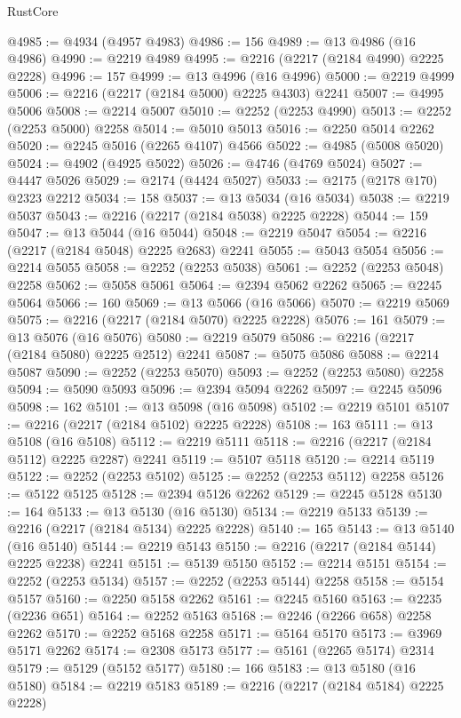\begin{lexlean}{RustCore}
\begin{coremodule}
@4985 := @4934 (@4957 @4983)
@4986 := 156
@4989 := @13 @4986 (@16 @4986)
@4990 := @2219 @4989
@4995 := @2216 (@2217 (@2184 @4990) @2225 @2228)
@4996 := 157
@4999 := @13 @4996 (@16 @4996)
@5000 := @2219 @4999
@5006 := @2216 (@2217 (@2184 @5000) @2225 @4303) @2241
@5007 := @4995 @5006
@5008 := @2214 @5007
@5010 := @2252 (@2253 @4990)
@5013 := @2252 (@2253 @5000) @2258
@5014 := @5010 @5013
@5016 := @2250 @5014 @2262
@5020 := @2245 @5016 (@2265 @4107) @4566
@5022 := @4985 (@5008 @5020)
@5024 := @4902 (@4925 @5022)
@5026 := @4746 (@4769 @5024)
@5027 := @4447 @5026
@5029 := @2174 (@4424 @5027)
@5033 := @2175 (@2178 @170) @2323 @2212
@5034 := 158
@5037 := @13 @5034 (@16 @5034)
@5038 := @2219 @5037
@5043 := @2216 (@2217 (@2184 @5038) @2225 @2228)
@5044 := 159
@5047 := @13 @5044 (@16 @5044)
@5048 := @2219 @5047
@5054 := @2216 (@2217 (@2184 @5048) @2225 @2683) @2241
@5055 := @5043 @5054
@5056 := @2214 @5055
@5058 := @2252 (@2253 @5038)
@5061 := @2252 (@2253 @5048) @2258
@5062 := @5058 @5061
@5064 := @2394 @5062 @2262
@5065 := @2245 @5064
@5066 := 160
@5069 := @13 @5066 (@16 @5066)
@5070 := @2219 @5069
@5075 := @2216 (@2217 (@2184 @5070) @2225 @2228)
@5076 := 161
@5079 := @13 @5076 (@16 @5076)
@5080 := @2219 @5079
@5086 := @2216 (@2217 (@2184 @5080) @2225 @2512) @2241
@5087 := @5075 @5086
@5088 := @2214 @5087
@5090 := @2252 (@2253 @5070)
@5093 := @2252 (@2253 @5080) @2258
@5094 := @5090 @5093
@5096 := @2394 @5094 @2262
@5097 := @2245 @5096
@5098 := 162
@5101 := @13 @5098 (@16 @5098)
@5102 := @2219 @5101
@5107 := @2216 (@2217 (@2184 @5102) @2225 @2228)
@5108 := 163
@5111 := @13 @5108 (@16 @5108)
@5112 := @2219 @5111
@5118 := @2216 (@2217 (@2184 @5112) @2225 @2287) @2241
@5119 := @5107 @5118
@5120 := @2214 @5119
@5122 := @2252 (@2253 @5102)
@5125 := @2252 (@2253 @5112) @2258
@5126 := @5122 @5125
@5128 := @2394 @5126 @2262
@5129 := @2245 @5128
@5130 := 164
@5133 := @13 @5130 (@16 @5130)
@5134 := @2219 @5133
@5139 := @2216 (@2217 (@2184 @5134) @2225 @2228)
@5140 := 165
@5143 := @13 @5140 (@16 @5140)
@5144 := @2219 @5143
@5150 := @2216 (@2217 (@2184 @5144) @2225 @2238) @2241
@5151 := @5139 @5150
@5152 := @2214 @5151
@5154 := @2252 (@2253 @5134)
@5157 := @2252 (@2253 @5144) @2258
@5158 := @5154 @5157
@5160 := @2250 @5158 @2262
@5161 := @2245 @5160
@5163 := @2235 (@2236 @651)
@5164 := @2252 @5163
@5168 := @2246 (@2266 @658) @2258 @2262
@5170 := @2252 @5168 @2258
@5171 := @5164 @5170
@5173 := @3969 @5171 @2262
@5174 := @2308 @5173
@5177 := @5161 (@2265 @5174) @2314
@5179 := @5129 (@5152 @5177)
@5180 := 166
@5183 := @13 @5180 (@16 @5180)
@5184 := @2219 @5183
@5189 := @2216 (@2217 (@2184 @5184) @2225 @2228)

\end{coremodule}
\end{lexlean}

